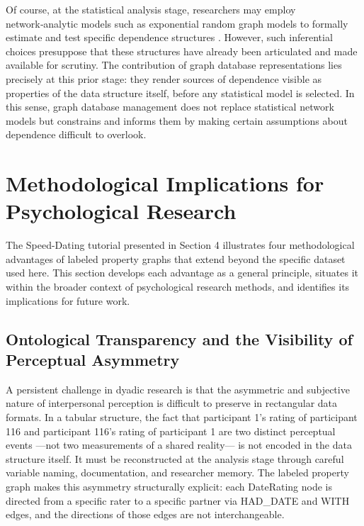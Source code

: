 \documentclass[sn-apa,pdflatex]{sn-jnl}
\theoremstyle{remark}
\theoremstyle{definition}
\begin{document}
Of course, at the statistical analysis stage, researchers may employ
network‑analytic models such as exponential random graph models to
formally estimate and test specific dependence structures
\citep{Lusher2013}. However, such inferential choices presuppose that
these structures have already been articulated and made available for
scrutiny. The contribution of graph database representations lies
precisely at this prior stage: they render sources of dependence visible
as properties of the data structure itself, before any statistical model
is selected. In this sense, graph database management does not replace
statistical network models but constrains and informs them by making
certain assumptions about dependence difficult to overlook.

\section{Methodological Implications for Psychological
Research}\label{methodological-implications-for-psychological-research}

The Speed-Dating tutorial presented in Section 4 illustrates four
methodological advantages of labeled property graphs that extend beyond
the specific dataset used here. This section develops each advantage as
a general principle, situates it within the broader context of
psychological research methods, and identifies its implications for
future work.

\subsection{Ontological Transparency and the Visibility of Perceptual
Asymmetry}\label{ontological-transparency-and-the-visibility-of-perceptual-asymmetry}

A persistent challenge in dyadic research is that the asymmetric and
subjective nature of interpersonal perception is difficult to preserve
in rectangular data formats. In a tabular structure, the fact that
participant 1's rating of participant 116 and participant 116's rating
of participant 1 are two distinct perceptual events ---not two
measurements of a shared reality--- is not encoded in the data structure
itself. It must be reconstructed at the analysis stage through careful
variable naming, documentation, and researcher memory. The labeled
property graph makes this asymmetry structurally explicit: each
DateRating node is directed from a specific rater to a specific partner
via HAD\_DATE and WITH edges, and the directions of those edges are not
interchangeable.
\end{document}
